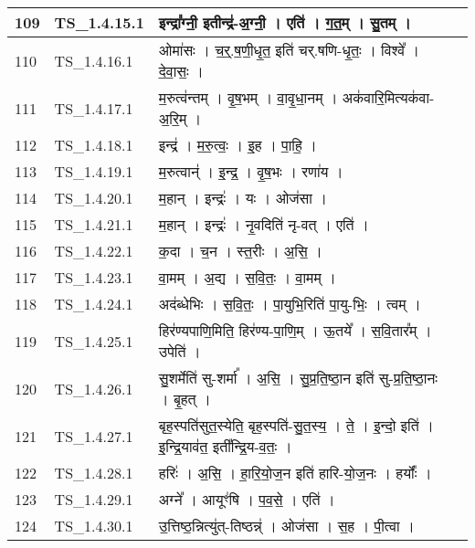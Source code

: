 \documentclass[17pt]{extarticle}
\begin{document}
\begin{longtable}{||p{0.4in}||p{0.9in}||p{4.0in}||p{0.9in}||}
        \hline
            109 & TS\_1.4.15.1 & इन्द्रा᳚ग्नी॒ इतीन्द्र॑{-}अ॒ग्नी॒   ।   एति॑   ।   ग॒त॒म्   ।   सु॒तम्   ।    &      \\
        \hline
            110 & TS\_1.4.16.1 & ओमा॑सः   ।   च॒र्॒.ष॒णी॒धृ॒त॒ इति॑ चर्.षणि{-}धृ॒तः॒   ।   विश्वे᳚   ।   दे॒वा॒सः॒   ।    &      \\
        \hline
            111 & TS\_1.4.17.1 & म॒रुत्व॑न्तम्   ।   वृ॒ष॒भम्   ।   वा॒वृ॒धा॒नम्   ।   अक॑वारि॒मित्यक॑वा{-}अ॒रि॒म्   ।    &      \\
        \hline
            112 & TS\_1.4.18.1 & इन्द्र॑   ।   म॒रु॒त्वः॒   ।   इ॒ह   ।   पा॒हि॒   ।    &      \\
        \hline
            113 & TS\_1.4.19.1 & म॒रुत्वान्॑   ।   इ॒न्द्र॒   ।   वृ॒ष॒भः   ।   रणा॑य   ।    &      \\
        \hline
            114 & TS\_1.4.20.1 & म॒हान्   ।   इन्द्रः॑   ।   यः   ।   ओज॑सा   ।    &      \\
        \hline
            115 & TS\_1.4.21.1 & म॒हान्   ।   इन्द्रः॑   ।   नृ॒वदिति॑ नृ{-}वत्   ।   एति॑   ।    &      \\
        \hline
            116 & TS\_1.4.22.1 & क॒दा   ।   च॒न   ।   स्त॒रीः   ।   अ॒सि॒   ।    &      \\
        \hline
            117 & TS\_1.4.23.1 & वा॒मम्   ।   अ॒द्य   ।   स॒वि॒तः॒   ।   वा॒मम्   ।    &      \\
        \hline
            118 & TS\_1.4.24.1 & अद॑ब्धेभिः   ।   स॒वि॒तः॒   ।   पा॒युभि॒रिति॑ पा॒यु{-}भिः॒   ।   त्वम्   ।    &      \\
        \hline
            119 & TS\_1.4.25.1 & हिर॑ण्यपाणि॒मिति॒ हिर॑ण्य{-}पा॒णि॒म्   ।   ऊ॒तये᳚   ।   स॒वि॒तार᳚म्   ।   उपेति॑   ।    &      \\
        \hline
            120 & TS\_1.4.26.1 & सु॒शर्मेति॑ सु{-}शर्मा᳚   ।   अ॒सि॒   ।   सु॒प्र॒ति॒ष्ठा॒न इति॑ सु{-}प्र॒ति॒ष्ठा॒नः   ।   बृ॒हत्   ।    &      \\
        \hline
            121 & TS\_1.4.27.1 & बृह॒स्पति॑सुत॒स्येति॒ बृह॒स्पति॑{-}सु॒त॒स्य॒   ।   ते॒   ।   इ॒न्दो॒ इति॑   ।   इ॒न्द्रि॒याव॑त॒ इती᳚न्द्रि॒य{-}व॒तः॒   ।    &      \\
        \hline
            122 & TS\_1.4.28.1 & हरिः॑   ।   अ॒सि॒   ।   हा॒रि॒यो॒ज॒न इति॑ हारि{-}यो॒ज॒नः   ।   हर्योः᳚   ।    &      \\
        \hline
            123 & TS\_1.4.29.1 & अग्ने᳚   ।   आयूꣳ॑षि   ।   प॒व॒से॒   ।   एति॑   ।    &      \\
        \hline
            124 & TS\_1.4.30.1 & उ॒त्तिष्ठ॒न्नित्यु॑त्{-}तिष्ठन्न्॑   ।   ओज॑सा   ।   स॒ह   ।   पी॒त्वा   ।    &      \\

\end{longtable}
\end{document}
